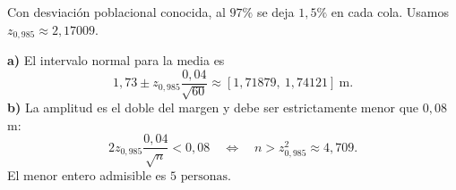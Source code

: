 Con desviación poblacional conocida, al $97\%$ se deja $1{,}5\%$ en cada cola. Usamos $z_{0{,}985}\approx2{,}17009$.

\textbf{a)} El intervalo normal para la media es
\[
1{,}73\pm z_{0{,}985}\frac{0{,}04}{\sqrt{60}}
\approx\boxed{[1{,}71879,\ 1{,}74121]}\ \text{m}.
\]
\textbf{b)} La amplitud es el doble del margen y debe ser estrictamente menor que $0{,}08$ m:
\[
2z_{0{,}985}\frac{0{,}04}{\sqrt n}<0{,}08
\quad\Longleftrightarrow\quad
n>z_{0{,}985}^2\approx4{,}709.
\]
El menor entero admisible es $\boxed{5\text{ personas}}$.
